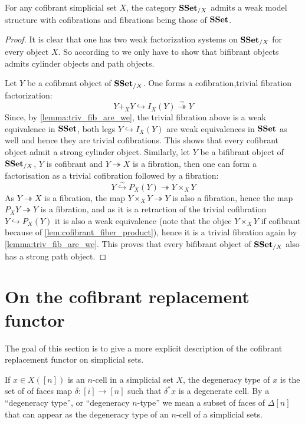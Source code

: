 \documentclass[reqno,10pt,a4paper,oneside,draft]{amsart}
\begin{document}
\begin{corollary}
For any cofibrant simplicial set $X$, the category $\mathbf{SSet}_{/X}$ admits a weak model structure with cofibrations and fibrations  being those of $\mathbf{SSet}$.
\end{corollary}

\begin{proof}

It is clear that one has two weak factorization systems on $\mathbf{SSet}_{/X}$ for every object $X$. So according to \cite[Definition~2.1.11]{henry2018wms} we only have to show that bifibrant objects admits cylinder objects and path objects.

Let $Y$ be a cofibrant object of $\mathbf{SSet}_{/X}$. One forms a cofibration,trivial fibration factorization:
\[ 
Y +_X Y \hookrightarrow I_X(Y) \overset{\sim}{\twoheadrightarrow} Y 
\]
Since, by  \cref{lemma:triv_fib_are_we}, the trivial fibration above is a weak equivalence in $\mathbf{SSet}$, both legs $Y \hookrightarrow I_X(Y)$ are weak equivalences in $\mathbf{SSet}$ as well and hence they are trivial cofibrations. This shows that every cofibrant object admit a strong cylinder object. Similarly, let $Y$ be a bifibrant object of $\mathbf{SSet}_{/X}$, \ie $Y$ is cofibrant and $Y \twoheadrightarrow X$ is a fibration, then one can form a factorisation as a trivial cofibration followed by a fibration:
\[ 
Y \overset{\sim}{\hookrightarrow} P_X(Y) {\twoheadrightarrow} Y \times_{X} Y 
\]
As $Y \twoheadrightarrow X$ is a fibration, the map $Y \times_X Y \twoheadrightarrow Y$ is also a fibration, hence the map $P_X Y \twoheadrightarrow Y$ is a fibration, and as it is a retraction of the trivial cofibration $Y \hookrightarrow P_X(Y)$ it is also a weak equivalence (note that the objec $Y \times_X Y$ if cofibrant because of \cref{lem:cofibrant_fiber_product}), hence it is a trivial fibration again by \cref{lemma:triv_fib_are_we}. This proves that every bifibrant object of $\mathbf{SSet}_{/X}$ also has a strong path object.
\end{proof}

\newpage

\section{On the cofibrant replacement functor}

The goal of this section is to give a more explicit description of the cofibrant replacement functor on simplicial sets.


\begin{definition}
If $x \in X([n])$ is an $n$-cell in a simplicial set $X$, the degeneracy type of $x$ is the set of of faces map $\delta:[i] \rightarrow [n]$ such that $\delta^* x$ is a degenerate cell. 
By a ``degeneracy type'', or ``degeneracy $n$-type'' we mean a subset of faces of $\Delta[n]$ that can appear as the degeneracy type of an $n$-cell of a simplicial sets.
\end{definition}
\end{document}
